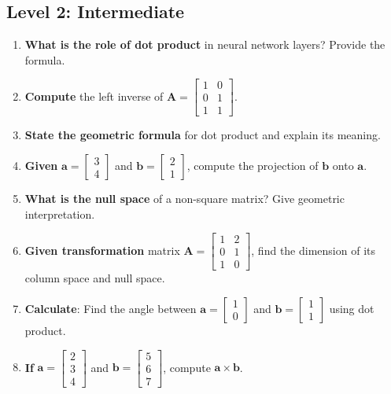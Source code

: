 \documentclass[12pt,a4paper]{article}
\theoremstyle{definition}
\begin{document}
\subsection{Level 2: Intermediate}

\begin{enumerate}[resume]
\item \textbf{What is the role of dot product} in neural network layers? Provide the formula.

\item \textbf{Compute} the left inverse of $\mathbf{A} = \begin{bmatrix} 1 & 0 \\ 0 & 1 \\ 1 & 1 \end{bmatrix}$.

\item \textbf{State the geometric formula} for dot product and explain its meaning.

\item \textbf{Given} $\mathbf{a} = \begin{bmatrix} 3 \\ 4 \end{bmatrix}$ and $\mathbf{b} = \begin{bmatrix} 2 \\ 1 \end{bmatrix}$, compute the projection of $\mathbf{b}$ onto $\mathbf{a}$.

\item \textbf{What is the null space} of a non-square matrix? Give geometric interpretation.

\item \textbf{Given transformation} matrix $\mathbf{A} = \begin{bmatrix} 1 & 2 \\ 0 & 1 \\ 1 & 0 \end{bmatrix}$, find the dimension of its column space and null space.

\item \textbf{Calculate}: Find the angle between $\mathbf{a} = \begin{bmatrix} 1 \\ 0 \end{bmatrix}$ and $\mathbf{b} = \begin{bmatrix} 1 \\ 1 \end{bmatrix}$ using dot product.

\item \textbf{If} $\mathbf{a} = \begin{bmatrix} 2 \\ 3 \\ 4 \end{bmatrix}$ and $\mathbf{b} = \begin{bmatrix} 5 \\ 6 \\ 7 \end{bmatrix}$, compute $\mathbf{a} \times \mathbf{b}$.


\end{enumerate}
\end{document}
